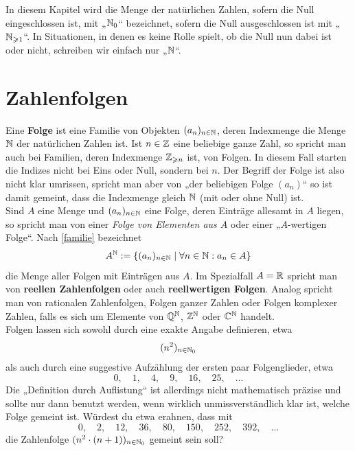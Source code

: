 %                                                                 
%
%
%



\begin{bem}
 In diesem Kapitel wird die Menge der natürlichen Zahlen, sofern die Null eingeschlossen ist, mit „${\mathbb N}_0$“ bezeichnet, sofern die Null ausgeschlossen ist mit „${\mathbb N}_{\geqslant 1}$“. In Situationen, in denen es keine Rolle spielt, ob die Null nun dabei ist oder nicht, schreiben wir einfach nur „${\mathbb N}$“.
\end{bem}



\section{Zahlenfolgen}

\begin{de}[Folge] \label{folge}
Eine \textbf{Folge} ist eine Familie von Objekten $(a_n)_{n\in {\mathbb N}}$, deren Indexmenge die Menge ${\mathbb N}$ der natürlichen Zahlen ist. Ist $n\in {\mathbb Z}$ eine beliebige ganze Zahl, so spricht man auch bei Familien, deren Indexmenge ${\mathbb Z}_{\geqslant n}$ ist, von Folgen. In diesem Fall starten die Indizes nicht bei Eins oder Null, sondern bei $n$. Der Begriff der Folge ist also nicht klar umrissen, spricht man aber von „der beliebigen Folge $(a_n)$“ so ist damit gemeint, dass die Indexmenge gleich ${\mathbb N}$ (mit oder ohne Null) ist. \\
Sind $A$ eine Menge und $(a_n)_{n\in {\mathbb N}}$ eine Folge, deren Einträge allesamt in $A$ liegen, so spricht man von einer \emph{Folge von Elementen aus $A$} oder einer „$A$-wertigen Folge“. Nach \cref{familie} bezeichnet
\[ A^{\mathbb N} := \{ (a_n)_{n\in {\mathbb N}} \mid \forall n\in {\mathbb N}: a_n\in A \} \]
die Menge aller Folgen mit Einträgen aus $A$. Im Spezialfall $A={\mathbb R}$ spricht man von \textbf{reellen Zahlenfolgen} oder auch \textbf{reellwertigen Folgen}. Analog spricht man von rationalen Zahlenfolgen, Folgen ganzer Zahlen oder Folgen komplexer Zahlen, falls es sich um Elemente von ${\mathbb Q}^{\mathbb N}$, ${\mathbb Z}^{\mathbb N}$ oder ${\mathbb C}^{\mathbb N}$ handelt. \\
Folgen lassen sich sowohl durch eine exakte Angabe definieren, etwa
\begin{align*}
  (n^2)_{n\in {\mathbb N}_0}
\end{align*}
als auch durch eine suggestive Aufzählung der ersten paar Folgenglieder, etwa
\[ 0,\quad 1,\quad 4,\quad 9,\quad 16,\quad 25,\quad\dots \]
Die „Definition durch Auflistung“ ist allerdings nicht mathematisch präzise und sollte nur dann benutzt werden, wenn wirklich unmissverständlich klar ist, welche Folge gemeint ist. Würdest du etwa erahnen, dass mit
\[ 0,\quad 2,\quad 12,\quad 36,\quad 80,\quad 150,\quad 252,\quad 392,\quad \dots\]
die Zahlenfolge $(n^2\cdot (n+1))_{n\in {\mathbb N}_0}$ gemeint sein soll?
\end{de}



